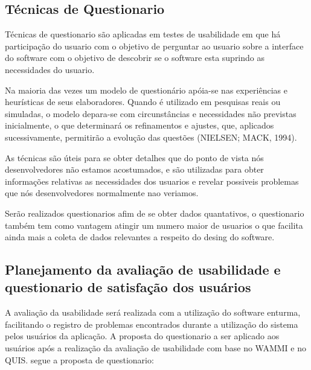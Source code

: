 \subsection{Técnicas de Questionario}
	Técnicas de questionario são aplicadas em testes de usabilidade em que há participação do usuario com o objetivo de perguntar ao usuario sobre a interface do software com o objetivo de descobrir se o software esta suprindo as necessidades do usuario.

	Na maioria das vezes um modelo de questionário apóia-se nas experiências e
	heurísticas de seus elaboradores. Quando é utilizado em pesquisas reais ou simuladas, o
	modelo depara-se com circunstâncias e necessidades não previstas inicialmente, o que
	determinará os refinamentos e ajustes, que, aplicados sucessivamente, permitirão a
	evolução das questões (NIELSEN; MACK, 1994). 
	
	As técnicas são úteis para se obter detalhes que do ponto de vista nós desenvolvedores não estamos acostumados, e são utilizadas para obter informações relativas as necessidades dos usuarios e revelar possiveis problemas que nós desenvolvedores normalmente nao veriamos.
	
	Serão realizados questionarios afim de se obter dados quantativos, o questionario também tem como vantagem atingir um numero maior de usuarios o que facilita ainda mais a coleta de dados relevantes a respeito do desing do software.
	
	


\subsection{Planejamento da avaliação de usabilidade e questionario de satisfação dos usuários}
	A avaliação da usabilidade será realizada com a utilização do software enturma, facilitando o registro de problemas encontrados durante a utilização do sistema pelos usuários da aplicação.
	A proposta do questionario a ser aplicado aos usuários após a realização da avaliação de usabilidade com base no WAMMI e no QUIS. segue a proposta de questionario:
	